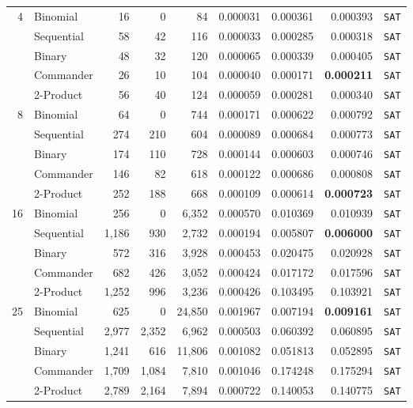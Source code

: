 \documentclass[a4paper,fleqn]{cas-sc}
\begin{document}
\begin{longtable}{r l r r r r r r c}
\multirow{5}{*}{4} 
 & Binomial & 16 & 0 & 84 & 0.000031 & 0.000361 & 0.000393 & \texttt{SAT} \\
 & Sequential & 58 & 42 & 116 & 0.000033 & 0.000285 & 0.000318 & \texttt{SAT} \\
 & Binary & 48 & 32 & 120 & 0.000065 & 0.000339 & 0.000405 & \texttt{SAT} \\
 & Commander & 26 & 10 & 104 & 0.000040 & 0.000171 & \textbf{0.000211} & \texttt{SAT} \\
 & 2-Product & 56 & 40 & 124 & 0.000059 & 0.000281 & 0.000340 & \texttt{SAT} \\
\midrule
\multirow{5}{*}{8} 
 & Binomial & 64 & 0 & 744 & 0.000171 & 0.000622 & 0.000792 & \texttt{SAT} \\
 & Sequential & 274 & 210 & 604 & 0.000089 & 0.000684 & 0.000773 & \texttt{SAT} \\
 & Binary & 174 & 110 & 728 & 0.000144 & 0.000603 & 0.000746 & \texttt{SAT} \\
 & Commander & 146 & 82 & 618 & 0.000122 & 0.000686 & 0.000808 & \texttt{SAT} \\
 & 2-Product & 252 & 188 & 668 & 0.000109 & 0.000614 & \textbf{0.000723} & \texttt{SAT} \\
\midrule
\multirow{5}{*}{16} 
 & Binomial & 256 & 0 & 6,352 & 0.000570 & 0.010369 & 0.010939 & \texttt{SAT} \\
 & Sequential & 1,186 & 930 & 2,732 & 0.000194 & 0.005807 & \textbf{0.006000} & \texttt{SAT} \\
 & Binary & 572 & 316 & 3,928 & 0.000453 & 0.020475 & 0.020928 & \texttt{SAT} \\
 & Commander & 682 & 426 & 3,052 & 0.000424 & 0.017172 & 0.017596 & \texttt{SAT} \\
 & 2-Product & 1,252 & 996 & 3,236 & 0.000426 & 0.103495 & 0.103921 & \texttt{SAT} \\
\midrule
\multirow{5}{*}{25} 
 & Binomial & 625 & 0 & 24,850 & 0.001967 & 0.007194 & \textbf{0.009161} & \texttt{SAT} \\
 & Sequential & 2,977 & 2,352 & 6,962 & 0.000503 & 0.060392 & 0.060895 & \texttt{SAT} \\
 & Binary & 1,241 & 616 & 11,806 & 0.001082 & 0.051813 & 0.052895 & \texttt{SAT} \\
 & Commander & 1,709 & 1,084 & 7,810 & 0.001046 & 0.174248 & 0.175294 & \texttt{SAT} \\
 & 2-Product & 2,789 & 2,164 & 7,894 & 0.000722 & 0.140053 & 0.140775 & \texttt{SAT} \\
\midrule

\end{longtable}
\end{document}
